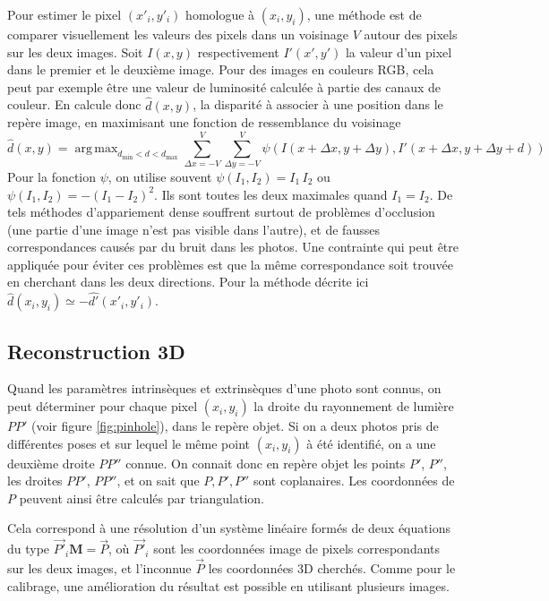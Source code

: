 \documentclass[a4paper,10pt]{scrreprt}
\DeclareMathOperator*{\argmax}{arg\,max}
\begin{document}
Pour estimer le pixel $(x'_i, y'_i)$ homologue à $(x_i, y_i)$, une méthode est de comparer visuellement les valeurs des pixels dans un voisinage $V$ autour des pixels sur les deux images. Soit $I(x, y)$ respectivement $I'(x', y')$ la valeur d'un pixel dans le premier et le deuxième image. Pour des images en couleurs RGB, cela peut par exemple être une valeur de luminosité calculée à partie des canaux de couleur. En calcule donc $\hat{d}(x, y)$, la disparité à associer à une position dans le repère image, en maximisant une fonction de ressemblance du voisinage
\begin{equation*}
	\hat{d}(x, y) = \argmax_{d_{\min} < d <  d_{\max}} \sum_{\Delta x=-V}^{V} \sum_{\Delta y=-V}^{V} \psi(I(x + \Delta x, y + \Delta y), I'(x + \Delta x, y + \Delta y + d))
\end{equation*}
Pour la fonction $\psi$, on utilise souvent $\psi(I_1, I_2) = I_1 \, I_2$ ou $\psi(I_1, I_2) = -(I_1 - I_2)^2$. Ils sont toutes les deux maximales quand $I_1 = I_2$. De tels méthodes d'appariement dense souffrent surtout de problèmes d'occlusion (une partie d'une image n'est pas visible dans l'autre), et de fausses correspondances causés par du bruit dans les photos. Une contrainte qui peut être appliquée pour éviter ces problèmes est que la même correspondance soit trouvée en cherchant dans les deux directions. Pour la méthode décrite ici $\hat{d}(x_i, y_i) \simeq -\hat{d'}(x'_i, y'_i)$.

\subsection{Reconstruction 3D}
Quand les paramètres intrinsèques et extrinsèques d'une photo sont connus, on peut déterminer pour chaque pixel $(x_i, y_i)$ la droite du rayonnement de lumière $P P'$ (voir figure \ref{fig:pinhole}), dans le repère objet. Si on a deux photos pris de différentes poses et sur lequel le même point $(x_i, y_i)$ à été identifié, on a une deuxième droite $P P''$ connue. On connait donc en repère objet les points $P'$, $P''$, les droites $P P'$, $P P''$, et on sait que $P, P', P''$ sont coplanaires. Les coordonnées de $P$ peuvent ainsi être calculés par triangulation.

Cela correspond à une résolution d'un système linéaire formés de deux équations du type $\vec{P'}_{i} \mathbf{M} = \vec{P}$, où $\vec{P'}_i$ sont les coordonnées image de pixels correspondants sur les deux images, et l'inconnue $\vec{P}$ les coordonnées 3D cherchés. Comme pour le calibrage, une amélioration du résultat est possible en utilisant plusieurs images.
\end{document}
